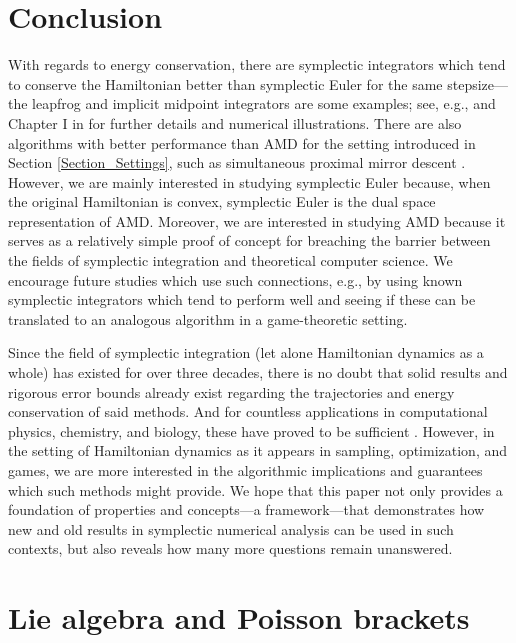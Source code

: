 \documentclass[11pt]{article}
\begin{document}
\section{Conclusion}\label{Section_Conclude}

With regards to energy conservation, there are symplectic integrators which tend to conserve the Hamiltonian better than symplectic Euler for the same stepsize---the leapfrog and implicit midpoint integrators are some examples; see, e.g., \cite{bou2018geometric} and Chapter I in \cite{Hairer2006} for further details and numerical illustrations. There are also algorithms with better performance than AMD for the setting introduced in Section \ref{Section_Settings}, such as simultaneous proximal mirror descent \citep{nemirovski2004mirrorprox,Wibisono2022}. However, we are mainly interested in studying symplectic Euler because, when the original Hamiltonian is convex, symplectic Euler is the dual space representation of AMD. Moreover, we are interested in studying AMD because it serves as a relatively simple proof of concept for breaching the barrier between the fields of symplectic integration and theoretical computer science. We encourage future studies which use such connections, e.g., by using known symplectic integrators which tend to perform well and seeing if these can be translated to an analogous algorithm in a game-theoretic setting.

Since the field of symplectic integration (let alone Hamiltonian dynamics as a whole) has existed for over three decades, there is no doubt that solid results and rigorous error bounds already exist regarding the trajectories and energy conservation of said methods. And for countless applications in computational physics, chemistry, and biology, these have proved to be sufficient \citep[e.g.,][]{Engle2005,Skeel,Casas}. However, in the setting of Hamiltonian dynamics as it appears in sampling, optimization, and games, we are more interested in the algorithmic implications and guarantees which such methods might provide. We hope that this paper not only provides a foundation of properties and concepts---a framework---that demonstrates how new and old results in symplectic numerical analysis can be used in such contexts, but also reveals how many more questions remain unanswered.

\appendix

\section{Lie algebra and Poisson brackets}\label{Liealgebra}
\end{document}
